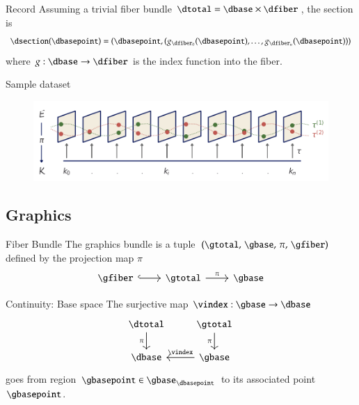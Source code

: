 \documentclass[xcolor={dvipsnames}, handout]{beamer}
\begin{document}
\begin{frame}{Record}
    Assuming a trivial fiber bundle $\dtotal = \dbase \times \dfiber$, the section is 
\begin{equation}
    \label{eq:section_return}
    \dsection(\dbasepoint) = (\dbasepoint, (g_{\dfiber_{0}}(\dbasepoint), \ldots, g_{\dfiber_{n}}(\dbasepoint)))
\end{equation}
where $g: \dbase \rightarrow \dfiber$ is the index function into the fiber.
\end{frame}

\begin{frame}{Sample dataset}
    \begin{figure}[H]
        \includegraphics[width=1\linewidth]{figures/math/fiberbundle.png}
        \label{fig:data_sections}
    \end{figure}
\end{frame}

\subsection{Graphics}
\begin{frame}{Fiber Bundle}
    The graphics bundle is a tuple $(\gtotal,\,\gbase,\,\pi ,\,\gfiber)$ defined by the projection map $\pi$
    \begin{equation}
        \label{eq:fiber_bundle}
        \begin{tikzcd}[ampersand replacement=\&]
            \gfiber \arrow[r, hook] \& \gtotal \arrow[r, "\pi"] \& \gbase
        \end{tikzcd}
    \end{equation}
\end{frame}


\begin{frame}{Continuity: Base space}
    The surjective map $\vindex: \gbase \rightarrow \dbase$ 
    \begin{equation}
        \begin{tikzcd}[ampersand replacement=\&]
            \dtotal \arrow[d, "\pi"'] \& \gtotal \arrow[d, "\pi"'] \\
            \dbase                   \& \gbase \arrow[l, "\vindex"']
        \end{tikzcd}
    \end{equation}
    goes from region $\gbasepoint \in \gbase_{\dbasepoint}$ to its associated point $\gbasepoint$. 
\end{frame}
\end{document}
